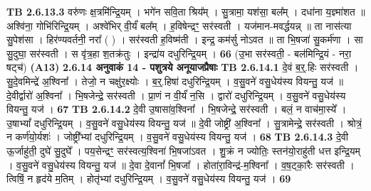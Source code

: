 \documentclass[17pt]{extarticle}
\begin{document}
                                \textbf{ TB 2.6.13.3} \newline
                  वरु॑णः क्ष॒त्रमि॑न्द्रि॒यम् । भगे॑न सवि॒ता श्रिय᳚म् । सु॒त्रामा॒ यश॑सा॒ बल᳚म् । दधा॑ना य॒ज्ञ्मा॑शत ॥ अश्वि॑ना॒ गोभि॑रिन्द्रि॒यम् । अश्वे॑भिर् वी॒र्यं॑ बल᳚म् । ह॒विषेन्द्रꣳ॒॒ सर॑स्वती । यज॑मान-मवर्द्धयन्न् ॥ ता नास॑त्या सु॒पेश॑सा । हिर॑ण्यवर्तनी॒ नरा᳚ ( ) । सर॑स्वती ह॒विष्म॑ती । इन्द्र॒ कम॑र्सु नोऽवत ॥ ता भि॒षजा॑ सु॒कर्म॑णा । सा सु॒दुघा॒ सर॑स्वती । स वृ॑त्र॒हा श॒तक्र॑तुः । इन्द्रा॑य दधुरिन्द्रि॒यम् । \textbf{ 66} \newline
                  \newline
                                    (उ॒भा सर॑स्वती॒ - बल॑मिन्द्रि॒यं - नरा॒ षट्च॑) \textbf{(A13)} \newline \newline
                \textbf{ 2.6.14    अनुवाकं   14 - पशुत्रये अनूयाजप्रैषाः} \newline
                                \textbf{ TB 2.6.14.1} \newline
                  दे॒वं ब॒र्॒.हिः सर॑स्वती । सु॒दे॒वमिन्द्रे॑ अ॒श्विना᳚ । तेजो॒ न चक्षु॑र॒क्ष्योः । ब॒र्॒.हिषा॑ दधुरिन्द्रि॒यम् । व॒सु॒वने॑ वसु॒धेय॑स्य वियन्तु॒ यज॑ ॥ दे॒वीर्द्वारो॑ अ॒श्विना᳚ । भि॒षजेन्द्रे॒ सर॑स्वती । प्रा॒णं न वी॒र्यं॑ न॒सि । द्वारो॑ दधुरिन्द्रि॒यम् । व॒सु॒वने॑ वसु॒धेय॑स्य वियन्तु॒ यज॑ । \textbf{ 67} \newline
                  \newline
                                \textbf{ TB 2.6.14.2} \newline
                  दे॒वी उ॒षासा॑व॒श्विना᳚ । भि॒षजेन्द्रे॒ सर॑स्वती । बलं॒ न वाच॑मा॒स्ये᳚ । उ॒षाभ्यां᳚ दधुरिन्द्रि॒यम् । व॒सु॒वने॑ वसु॒धेय॑स्य वियन्तु॒ यज॑ ॥ दे॒वी जोष्ट्री॑ अ॒श्विना᳚ । सु॒त्रामेन्द्रे॒ सर॑स्वती । श्रोत्रं॒ न कर्ण॑यो॒र्यशः॑ । जोष्ट्री᳚भ्यां दधुरिन्द्रि॒यम् । व॒सु॒वने॑ वसु॒धेय॑स्य वियन्तु॒ यज॑ । \textbf{ 68} \newline
                  \newline
                                \textbf{ TB 2.6.14.3} \newline
                  दे॒वी ऊ॒र्जाहु॑ती॒ दुघे॑ सु॒दुघे᳚ । पय॒सेन्द्रꣳ॒॒ सर॑स्वत्य॒श्विना॑ भि॒षजा॑ऽवत । शु॒क्रं न ज्योतिः॒ स्तन॑यो॒राहु॑ती धत्त इन्द्रि॒यम् । व॒सु॒वने॑ वसु॒धेय॑स्य वियन्तु॒ यज॑ ॥ दे॒वा दे॒वानां᳚ भि॒षजा᳚ । होता॑रा॒विन्द्र॑-म॒श्विना᳚ । व॒ष॒ट्का॒रैः सर॑स्वती । त्विषिं॒ न हृद॑ये म॒तिम् । होतृ॑भ्यां दधुरिन्द्रि॒यम् । व॒सु॒वने॑ वसु॒धेय॑स्य वियन्तु॒ यज॑ । \textbf{ 69} \newline
                  \newline
\end{document}
